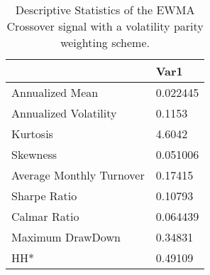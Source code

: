 \begin{table}[H]
\centering
\begin{tabular}{ll}
& Var1 \\ 
\hline 
Annualized Mean & 0.022445 \\ 
Annualized Volatility & 0.1153 \\ 
Kurtosis & 4.6042 \\ 
Skewness & 0.051006 \\ 
Average Monthly Turnover & 0.17415 \\ 
Sharpe Ratio & 0.10793 \\ 
Calmar Ratio & 0.064439 \\ 
Maximum DrawDown & 0.34831 \\ 
HH* & 0.49109 \\ 
\hline
\end{tabular}
\caption{Descriptive Statistics of the EWMA Crossover signal with a volatility parity weighting scheme.}
\label{MBBSVPNR}
\end{table}